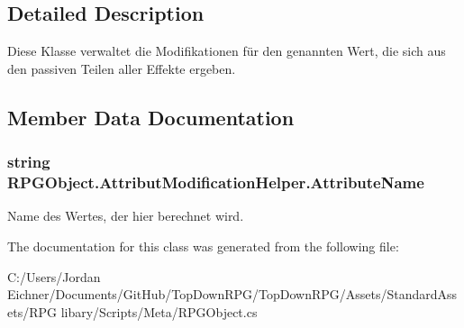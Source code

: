 \subsection{Detailed Description}
Diese Klasse verwaltet die Modifikationen für den genannten Wert, die sich aus den passiven Teilen aller Effekte ergeben. 

\subsection{Member Data Documentation}
\hypertarget{class_r_p_g_object_1_1_attribut_modification_helper_a7d284a483e95ba8c7de9f536f50fd395}{}
\subsubsection[{Attribute\+Name}]{\setlength{\rightskip}{0pt plus 5cm}string R\+P\+G\+Object.\+Attribut\+Modification\+Helper.\+Attribute\+Name}\label{class_r_p_g_object_1_1_attribut_modification_helper_a7d284a483e95ba8c7de9f536f50fd395}
Name des Wertes, der hier berechnet wird. 

The documentation for this class was generated from the following file\+:\begin{DoxyCompactItemize}
\item 
C\+:/\+Users/\+Jordan Eichner/\+Documents/\+Git\+Hub/\+Top\+Down\+R\+P\+G/\+Top\+Down\+R\+P\+G/\+Assets/\+Standard\+Assets/\+R\+P\+G libary/\+Scripts/\+Meta/R\+P\+G\+Object.\+cs\end{DoxyCompactItemize}
